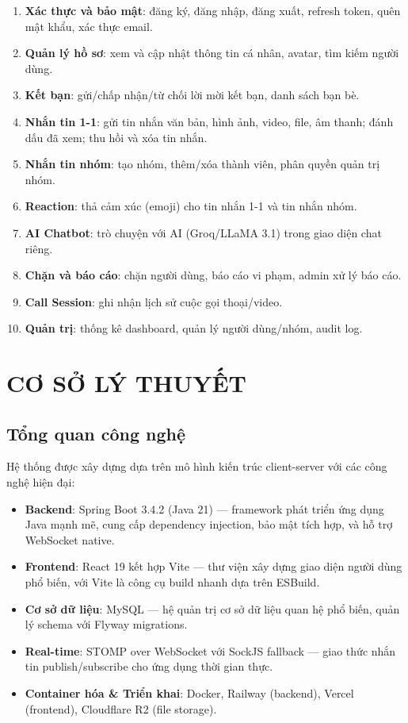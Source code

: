 \documentclass[12pt,a4paper]{report}
\begin{document}
\begin{enumerate}
    \item \textbf{Xác thực và bảo mật}: đăng ký, đăng nhập, đăng xuất, refresh token, quên mật khẩu, xác thực email.
    \item \textbf{Quản lý hồ sơ}: xem và cập nhật thông tin cá nhân, avatar, tìm kiếm người dùng.
    \item \textbf{Kết bạn}: gửi/chấp nhận/từ chối lời mời kết bạn, danh sách bạn bè.
    \item \textbf{Nhắn tin 1-1}: gửi tin nhắn văn bản, hình ảnh, video, file, âm thanh; đánh dấu đã xem; thu hồi và xóa tin nhắn.
    \item \textbf{Nhắn tin nhóm}: tạo nhóm, thêm/xóa thành viên, phân quyền quản trị nhóm.
    \item \textbf{Reaction}: thả cảm xúc (emoji) cho tin nhắn 1-1 và tin nhắn nhóm.
    \item \textbf{AI Chatbot}: trò chuyện với AI (Groq/LLaMA 3.1) trong giao diện chat riêng.
    \item \textbf{Chặn và báo cáo}: chặn người dùng, báo cáo vi phạm, admin xử lý báo cáo.
    \item \textbf{Call Session}: ghi nhận lịch sử cuộc gọi thoại/video.
    \item \textbf{Quản trị}: thống kê dashboard, quản lý người dùng/nhóm, audit log.
\end{enumerate}

\chapter{CƠ SỞ LÝ THUYẾT}

\section{Tổng quan công nghệ}

Hệ thống được xây dựng dựa trên mô hình kiến trúc client-server với các công nghệ hiện đại:

\begin{itemize}
    \item \textbf{Backend}: Spring Boot 3.4.2 (Java 21) --- framework phát triển ứng dụng Java mạnh mẽ, cung cấp dependency injection, bảo mật tích hợp, và hỗ trợ WebSocket native.
    \item \textbf{Frontend}: React 19 kết hợp Vite --- thư viện xây dựng giao diện người dùng phổ biến, với Vite là công cụ build nhanh dựa trên ESBuild.
    \item \textbf{Cơ sở dữ liệu}: MySQL --- hệ quản trị cơ sở dữ liệu quan hệ phổ biến, quản lý schema với Flyway migrations.
    \item \textbf{Real-time}: STOMP over WebSocket với SockJS fallback --- giao thức nhắn tin publish/subscribe cho ứng dụng thời gian thực.
    \item \textbf{Container hóa \& Triển khai}: Docker, Railway (backend), Vercel (frontend), Cloudflare R2 (file storage).
\end{itemize}
\end{document}
